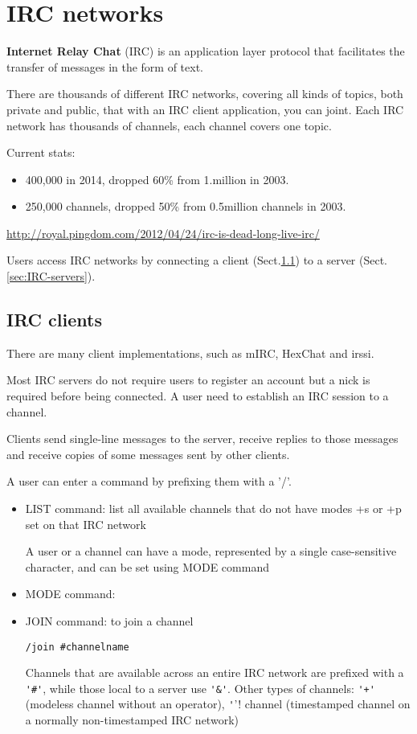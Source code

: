 \chapter{IRC networks}


{\bf Internet Relay Chat} (IRC) is an application layer protocol that
facilitates the transfer of messages in the form of text.

There are thousands of different IRC networks, covering all kinds of topics,
both private and public, that with an IRC client application, you can joint.
Each IRC network has thousands of channels, each channel covers one topic.

Current stats:
\begin{itemize}
  \item 400,000 in 2014, dropped 60\% from 1.million in 2003.
  
  \item 250,000 channels, dropped 50\% from 0.5million channels in 2003.
\end{itemize}
\url{http://royal.pingdom.com/2012/04/24/irc-is-dead-long-live-irc/}
  
Users access IRC networks by connecting a client (Sect.\ref{sec:IRC-clients}) to
a server (Sect.\ref{sec:IRC-servers}).

\section{IRC clients}
\label{sec:IRC-clients}


There are many client implementations, such as mIRC, HexChat and irssi.

Most IRC servers do not require users to register an account but a nick is
required before being connected. A user need to establish an IRC session to a
channel.
 
Clients send single-line messages to the server, receive replies to those
messages  and receive copies of some messages sent by other clients.

A user can enter a command by prefixing them with a '/'. 
\begin{itemize}
  \item LIST command: list all available channels that do not have  
  modes +s or +p set on that IRC network
  
  A user or a channel can have a mode,
  represented by a single case-sensitive character, and can be set using MODE
  command
  
  \item MODE command: 
  
  \item JOIN command: to join a channel
\begin{verbatim}
/join #channelname
\end{verbatim}  
Channels that are available across an entire IRC network are prefixed with a
\verb!'#'!, while those local to a server use \verb!'&'!. Other types of
channels: \verb!'+'! (modeless channel without an operator), \verb!'!'! channel
(timestamped channel on a normally non-timestamped IRC network)
  
\end{itemize}

